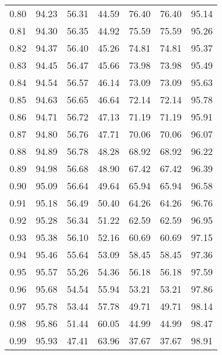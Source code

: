 \begin{tabular}{|c|c|c|c|c|c|c|}
      0.80 &     94.23 &     56.31 &      44.59 &   76.40 &      76.40 &         95.14 \\
      0.81 &     94.30 &     56.35 &      44.92 &   75.59 &      75.59 &         95.26 \\
      0.82 &     94.37 &     56.40 &      45.26 &   74.81 &      74.81 &         95.37 \\
      0.83 &     94.45 &     56.47 &      45.66 &   73.98 &      73.98 &         95.49 \\
      0.84 &     94.54 &     56.57 &      46.14 &   73.09 &      73.09 &         95.63 \\
      0.85 &     94.63 &     56.65 &      46.64 &   72.14 &      72.14 &         95.78 \\
      0.86 &     94.71 &     56.72 &      47.13 &   71.19 &      71.19 &         95.91 \\
      0.87 &     94.80 &     56.76 &      47.71 &   70.06 &      70.06 &         96.07 \\
      0.88 &     94.89 &     56.78 &      48.28 &   68.92 &      68.92 &         96.22 \\
      0.89 &     94.98 &     56.68 &      48.90 &   67.42 &      67.42 &         96.39 \\
      0.90 &     95.09 &     56.64 &      49.64 &   65.94 &      65.94 &         96.58 \\
      0.91 &     95.18 &     56.49 &      50.40 &   64.26 &      64.26 &         96.76 \\
      0.92 &     95.28 &     56.34 &      51.22 &   62.59 &      62.59 &         96.95 \\
      0.93 &     95.38 &     56.10 &      52.16 &   60.69 &      60.69 &         97.15 \\
      0.94 &     95.46 &     55.64 &      53.09 &   58.45 &      58.45 &         97.36 \\
      0.95 &     95.57 &     55.26 &      54.36 &   56.18 &      56.18 &         97.59 \\
      0.96 &     95.68 &     54.54 &      55.94 &   53.21 &      53.21 &         97.86 \\
      0.97 &     95.78 &     53.44 &      57.78 &   49.71 &      49.71 &         98.14 \\
      0.98 &     95.86 &     51.44 &      60.05 &   44.99 &      44.99 &         98.47 \\
      0.99 &     95.93 &     47.41 &      63.96 &   37.67 &      37.67 &         98.91 \\
\bottomrule
\end{tabular}
